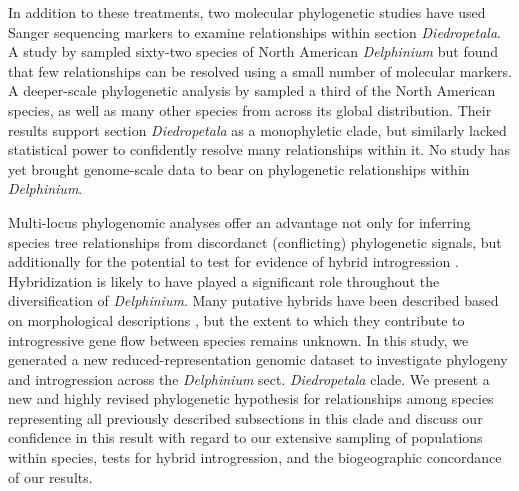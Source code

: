 \documentclass[11pt]{article}
\begin{document}
In addition to these treatments, two molecular phylogenetic studies have used
Sanger sequencing markers to examine relationships within section \emph{Diedropetala}.
A study by \citet{koontz_using_2004} sampled sixty-two species of 
North American \emph{Delphinium} but found that few relationships can
be resolved using a small number of molecular markers. 
% 
A deeper-scale phylogenetic analysis by \cite{jabbour_phylogeny_2012} 
sampled a third of the North American species, as well as many other
species from across its global distribution.
Their results support section \emph{Diedropetala} as a monophyletic 
clade, but similarly lacked statistical power to confidently 
resolve many relationships within it.
% 
No study has yet brought genome-scale data to bear on phylogenetic 
relationships within \emph{Delphinium}.


Multi-locus phylogenomic analyses offer an advantage not only for inferring
species tree relationships from discordanct (conflicting) phylogenetic signals, 
but additionally for the potential to test for evidence of hybrid introgression
\citep{kubatko_species_2023}.
% 
Hybridization is likely to have played a significant role throughout the 
diversification of \emph{Delphinium}. 
Many putative hybrids have been described based on morphological descriptions 
\citep{ewan_synopsis_1945, warnock_taxonomic_1995, legro_species_1961, koontz_hybrid_2001},
but the extent to which they contribute to introgressive gene 
flow between species remains unknown.
% 
% 
In this study, we generated a new reduced-representation genomic dataset to 
investigate phylogeny and introgression across the \emph{Delphinium} sect. 
\emph{Diedropetala} clade. 
% 
We present a new and highly revised phylogenetic hypothesis for relationships
among species representing all previously described subsections in this clade 
and discuss our confidence in this result with regard to our 
extensive sampling of populations within species, tests for hybrid 
introgression, and the biogeographic concordance of our results.


\end{document}
